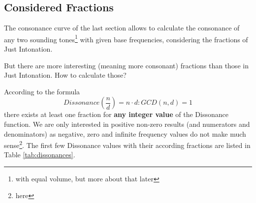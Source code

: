 \documentclass[12pt,a4paper,titlepage,oneside]{report}
\begin{document}
\subsection{Considered Fractions}

The consonance curve of the last section allows to calculate the consonance of any two sounding tones\footnote{with equal volume, but more about that later} with given base frequencies, considering the fractions of Just Intonation.

But there are more interesting (meaning more consonant) fractions than those in Just Intonation. How to calculate those?

According to the formula 
\[Dissonance(\frac{n}{d}) = n \cdot d : GCD(n,d) = 1\]
there exists at least one fraction for \textbf{any integer value} of the Dissonance function. We are only interested in positive non-zero results (and numerators and denominators) as negative, zero and infinite frequency values do not make much sense\footnote{here}. The first few Dissonance values with their according fractions are listed in Table \ref{tab:dissonances}.
\end{document}

